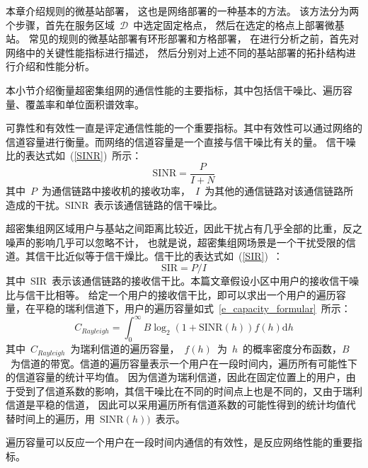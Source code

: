

本章介绍规则的微基站部署，
这也是网络部署的一种基本的方法。
该方法分为两个步骤，首先在服务区域~$\mathcal{D}$~中选定固定格点，
然后在选定的格点上部署微基站。
常见的规则的微基站部署有环形部署和方格部署，
在进行分析之前，首先对网络中的关键性能指标进行描述，
然后分别对上述不同的基站部署的拓扑结构进行介绍和性能分析。

本小节介绍衡量超密集组网的通信性能的主要指标，其中包括信干噪比、遍历容量、覆盖率和单位面积谱效率。


可靠性和有效性一直是评定通信性能的一个重要指标。其中有效性可以通过网络的信道容量进行衡量。而网络的信道容量是一个直接与信干噪比有关的量。
信干噪比的表达式如~(\ref{SINR})~所示：
\begin{equation}\label{SINR}
  \mathrm{SINR}=\frac{P}{I+N}
\end{equation}
其中~$P$~为通信链路中接收机的接收功率，~$I$~为其他的通信链路对该通信链路所造成的干扰。$\mathrm{SINR}$~表示该通信链路的信干噪比。

超密集组网区域用户与基站之间距离比较近，因此干扰占有几乎全部的比重，反之噪声的影响几乎可以忽略不计，
也就是说，超密集组网场景是一个干扰受限的信道。其信干比近似等于信干燥比。信干比的表达式如~(\ref{SIR})~：
\begin{equation}\label{SIR}
  \mathrm{SIR}=P/I
\end{equation}
其中~$\mathrm{SIR}$~表示该通信链路的接收信干比。本篇文章假设小区中用户的接收信干噪比与信干比相等。
给定一个用户的接收信干比，即可以求出一个用户的遍历容量，在平稳的瑞利信道下，用户的遍历容量如式~\ref{e_capacity_formular}~所示：
\begin{equation}\label{e_capacity_formular}
  C_{Rayleigh} = \int_{0}^{\infty} B \log_2(1+\mathrm{SINR}(h)) f(h) \mathrm{d} h
\end{equation}
其中~$C_{Rayleigh}$~为瑞利信道的遍历容量，~$f(h)$~为~$h$~的概率密度分布函数，$B$~为信道的带宽。信道的遍历容量表示一个用户在一段时间内，遍历所有可能性下的信道容量的统计平均值。
因为信道为瑞利信道，因此在固定位置上的用户，由于受到了信道系数的影响，其信干噪比在不同的时间点上也是不同的，又由于瑞利信道是平稳的信道，
因此可以采用遍历所有信道系数的可能性得到的统计均值代替时间上的遍历，用~$\mathrm{SINR}(h))$~表示。

遍历容量可以反应一个用户在一段时间内通信的有效性，是反应网络性能的重要指标。


